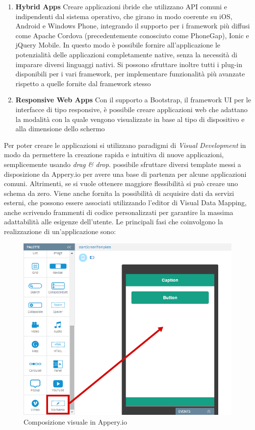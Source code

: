\begin{enumerate}
	\item \textbf{Hybrid Apps}
	Creare applicazioni ibride che utilizzano API comuni e indipendenti dal sistema operativo, che girano in modo coerente su iOS, Android e Windows Phone, integrando il supporto per i framework più diffusi come Apache Cordova (precedentemente conosciuto come PhoneGap), Ionic e jQuery Mobile. In questo modo è possibile fornire all'applicazione le potenzialità delle applicazioni completamente native, senza la necessità di imparare diversi linguaggi nativi. Si possono sfruttare inoltre tutti i plug-in disponibili per i vari framework, per implementare funzionalità più avanzate rispetto a quelle fornite dal framework stesso
	\item \textbf{Responsive Web Apps}
	Con il supporto a Bootstrap, il framework UI per le interfacce di tipo responsive, è possibile creare applicazioni web che adattano la modalità con la quale vengono visualizzate in base al tipo di dispositivo e alla dimensione dello schermo
\end{enumerate}

Per poter creare le applicazioni si utilizzano paradigmi di \emph{Visual Development} in modo da permettere la creazione rapida e intuitiva di nuove applicazioni, semplicemente usando \emph{drag \& drop}. \upe possibile sfruttare diversi template messi a disposizione da Appery.io per avere una base di partenza per alcune applicazioni comuni. Altrimenti, se si vuole ottenere maggiore flessibilità si può creare uno schema da zero. Viene anche fornita la possibilità di acquisire dati da servizi esterni, che possono essere associati utilizzando l'editor di Visual Data Mapping, anche scrivendo frammenti di codice personalizzati per garantire la massima adattabilità alle esigenze dell'utente. Le principali fasi che coinvolgono la realizzazione di un'applicazione sono:

\begin{figure}[ht]
	\centering
	\includegraphics[width=\textwidth]{2-preliminari/Immagini/appery-visual-composition.png}
	\caption{Composizione visuale in Appery.io}\label{fig:appery-visual-composition}
\end{figure}

